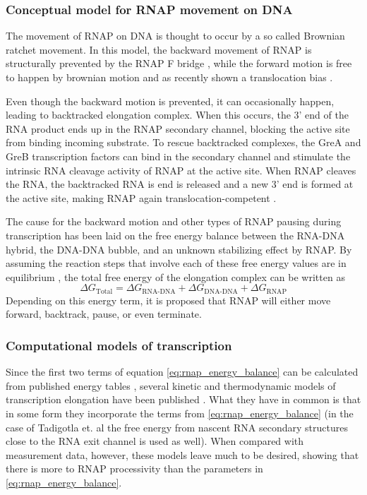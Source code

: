 \subsubsection{Conceptual model for RNAP movement on DNA}
The movement of RNAP on DNA is thought to occur by a so called Brownian ratchet
movement. In this model, the backward movement of RNAP is structurally
prevented by the RNAP F bridge \cite{_ratchet_2005}, while the forward motion
is free to happen by brownian motion and as recently shown a translocation bias
\cite{hein_rna_2011}.

Even though the backward motion is prevented, it can occasionally happen,
leading to backtracked elongation complex. When this occurs, the 3' end of the
RNA product ends up in the RNAP secondary channel, blocking the active site
from binding incoming substrate. To rescue backtracked complexes, the GreA and
GreB transcription factors can bind in the secondary channel and stimulate the
intrinsic RNA cleavage activity of RNAP at the active site. When RNAP cleaves
the RNA, the backtracked RNA is end is released and a new 3' end is formed at
the active site, making RNAP again translocation-competent
\cite{toulme_grea_2000}.

The cause for the backward motion and other types of RNAP pausing during
transcription has been laid on the free energy balance between the RNA-DNA
hybrid, the DNA-DNA bubble, and an unknown stabilizing effect by
RNAP\cite{greive_thinking_2005}. By assuming the reaction steps that involve
each of these free energy values are in equilibrium
\cite{greive_thinking_2005}, the total free energy of the elongation complex
can be written as 
\begin{equation}
	\Delta G_{\text{Total}} = \Delta G_{\text{RNA-DNA}} + \Delta
	G_{\text{DNA-DNA}} + \Delta G_{\text{RNAP}}
	\label{eq:rnap_energy_balance}
\end{equation}
Depending on this energy term, it is proposed that RNAP will either move
forward, backtrack, pause, or even terminate.

\subsubsection{Computational models of transcription}
Since the first two terms of equation \eqref{eq:rnap_energy_balance} can be
calculated from published energy tables \cite{wu_temperature_2002}
\cite{santalucia_thermodynamics_2004}, several kinetic and thermodynamic models
of transcription elongation have been published
\cite{tadigotla_thermodynamic_2006-1} \cite{bai_sequence-dependent_2004}
\cite{guajardo_model_1997}. What they have in common is that in some form they
incorporate the terms from \eqref{eq:rnap_energy_balance} (in the case of
Tadigotla et. al the free energy from nascent RNA secondary structures close
to the RNA exit channel is used as well). When compared with measurement data,
however, these models leave much to be desired, showing that there is more to
RNAP processivity than the parameters in \eqref{eq:rnap_energy_balance}.

